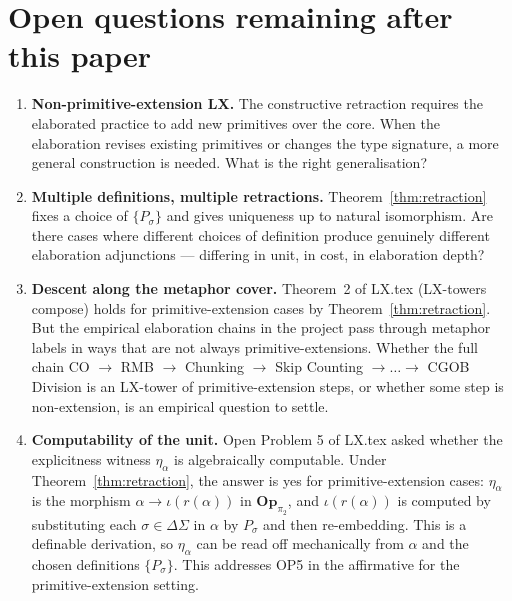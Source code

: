 \documentclass[11pt]{article}
\begin{document}
\section{Open questions remaining after this paper}

\begin{enumerate}[noitemsep,topsep=2pt,label=(\arabic*)]
  \item \textbf{Non-primitive-extension LX.} The constructive
        retraction requires the elaborated practice to add new
        primitives over the core. When the elaboration revises
        existing primitives or changes the type signature, a more
        general construction is needed. What is the right
        generalisation?
  \item \textbf{Multiple definitions, multiple retractions.}
        Theorem~\ref{thm:retraction} fixes a choice of
        $\{P_\sigma\}$ and gives uniqueness up to natural
        isomorphism. Are there cases where different choices of
        definition produce genuinely different elaboration adjunctions —
        differing in unit, in cost, in elaboration depth?
  \item \textbf{Descent along the metaphor cover.} Theorem~2 of
        LX.tex (LX-towers compose) holds for primitive-extension
        cases by Theorem~\ref{thm:retraction}. But the empirical
        elaboration chains in the project pass through metaphor
        labels in ways that are not always primitive-extensions.
        Whether the full chain CO $\to$ RMB $\to$ Chunking $\to$ Skip
        Counting $\to \ldots \to$ CGOB Division is an LX-tower of
        primitive-extension steps, or whether some step is
        non-extension, is an empirical question to settle.
  \item \textbf{Computability of the unit.} Open Problem 5 of
        LX.tex asked whether the explicitness witness $\eta_\alpha$
        is algebraically computable. Under
        Theorem~\ref{thm:retraction}, the answer is yes for
        primitive-extension cases: $\eta_\alpha$ is the morphism
        $\alpha \to \iota(r(\alpha))$ in $\mathbf{Op}_{\pi_2}$, and
        $\iota(r(\alpha))$ is computed by substituting each
        $\sigma \in \Delta\Sigma$ in $\alpha$ by $P_\sigma$ and
        then re-embedding. This is a definable derivation, so
        $\eta_\alpha$ can be read off mechanically from $\alpha$
        and the chosen definitions $\{P_\sigma\}$. This addresses
        OP5 in the affirmative for the primitive-extension setting.
\end{enumerate}
\end{document}
